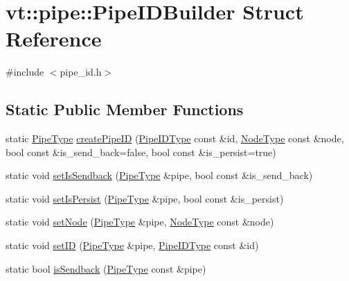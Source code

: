 \hypertarget{structvt_1_1pipe_1_1_pipe_i_d_builder}{}\section{vt\+:\+:pipe\+:\+:Pipe\+I\+D\+Builder Struct Reference}
\label{structvt_1_1pipe_1_1_pipe_i_d_builder}


{\ttfamily \#include $<$pipe\+\_\+id.\+h$>$}

\subsection*{Static Public Member Functions}
\begin{DoxyCompactItemize}
\item 
static \hyperlink{namespacevt_ac9852acda74d1896f48f406cd72c7bd3}{Pipe\+Type} \hyperlink{structvt_1_1pipe_1_1_pipe_i_d_builder_acb826a923e3af487c922d1263375d00d}{create\+Pipe\+ID} (\hyperlink{namespacevt_1_1pipe_a8aa7908de242917ac0922b9e9c85fea4}{Pipe\+I\+D\+Type} const \&id, \hyperlink{namespacevt_a866da9d0efc19c0a1ce79e9e492f47e2}{Node\+Type} const \&node, bool const \&is\+\_\+send\+\_\+back=false, bool const \&is\+\_\+persist=true)
\item 
static void \hyperlink{structvt_1_1pipe_1_1_pipe_i_d_builder_aba1c4bd52ca11ec80630cca91216c226}{set\+Is\+Sendback} (\hyperlink{namespacevt_ac9852acda74d1896f48f406cd72c7bd3}{Pipe\+Type} \&pipe, bool const \&is\+\_\+send\+\_\+back)
\item 
static void \hyperlink{structvt_1_1pipe_1_1_pipe_i_d_builder_abbacf9d32122e6b0502a53c0e48e0297}{set\+Is\+Persist} (\hyperlink{namespacevt_ac9852acda74d1896f48f406cd72c7bd3}{Pipe\+Type} \&pipe, bool const \&is\+\_\+persist)
\item 
static void \hyperlink{structvt_1_1pipe_1_1_pipe_i_d_builder_a7562c08f180335fec1eb7adb41a35587}{set\+Node} (\hyperlink{namespacevt_ac9852acda74d1896f48f406cd72c7bd3}{Pipe\+Type} \&pipe, \hyperlink{namespacevt_a866da9d0efc19c0a1ce79e9e492f47e2}{Node\+Type} const \&node)
\item 
static void \hyperlink{structvt_1_1pipe_1_1_pipe_i_d_builder_a47d32ec9891e61c47eb96edc10db1e12}{set\+ID} (\hyperlink{namespacevt_ac9852acda74d1896f48f406cd72c7bd3}{Pipe\+Type} \&pipe, \hyperlink{namespacevt_1_1pipe_a8aa7908de242917ac0922b9e9c85fea4}{Pipe\+I\+D\+Type} const \&id)
\item 
static bool \hyperlink{structvt_1_1pipe_1_1_pipe_i_d_builder_a5abea1b337eddd3c4958d563f69ee134}{is\+Sendback} (\hyperlink{namespacevt_ac9852acda74d1896f48f406cd72c7bd3}{Pipe\+Type} const \&pipe)

\end{DoxyCompactItemize}
